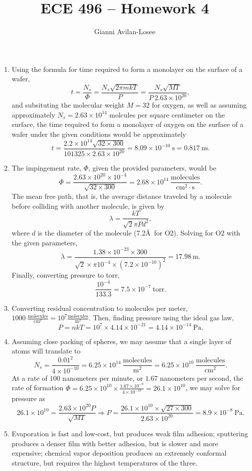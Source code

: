 \documentclass{article}
\title{ECE 496 -- Homework 4}
\author{Gianni Avilan-Losee}
\begin{document}
\setcounter{section}{6}
\setcounter{subsection}{1}
\begin{enumerate}[label=\thesubsection]
	\item Using the formula for time required to form a monolayer on the surface of a wafer,
		\[
			t=\frac{N_s}{\Phi} = \frac{N_s \sqrt{2\pi mkT}}{P} = \frac{N_s \sqrt{MT}}{P \ 2.63 \times 10^{20}},
		\]
		and subsituting the molecular weight \(M=32\) for oxygen, as well as assuming approximately \(N_s = 2.63 \times 10^{14}\) molcules per square centimeter on the surface, the time required to form a monolayer of oxygen on the surface of a wafer under the given conditions would be approximately
		\[
			t=\frac{2.2\times10^{14}\sqrt{32 \times 300}}{101325 \times 2.63 \times 10^{20}} = 8.09 \times 10^{-10} \ \mathrm{s} = 0.817 \ \mathrm{ns}.
		\]
\setcounter{subsection}{3}
\item The impingement rate, \(\Phi\), given the provided parameters, would be
	\[
		\Phi = \frac{2.63 \times 10^{20} \times 10^{-4}}{\sqrt{32 \times 300}} = 2.68 \times 10^{14} \ \mathrm{\frac{molecules}{cm^2 \cdot s}}.
	\]
	The mean free path, that is, the average distance traveled by a molecule before colliding with another molecule, is given by 
	\[
	  \lambda = \frac{kT}{\sqrt{2}\pi P d^2},
	\]
	where \(d\) is the diameter of the molecule (7.2\AA \ for O2). Solving for O2 with the given parameters,
	\[
		\lambda = \frac{1.38 \times 10^{-23} \times 300}{\sqrt{2} \times \pi 10^{-4} \times (7.2 \times 10^{-10})^2} = 17.98 \ \mathrm{m}.
	\]
	Finally, converting pressure to torr,
	\[
		\frac{10^{-4}}{133.3} = 7.5 \times 10^{-7} \ \mathrm{torr}.
	\]
	\setcounter{subsection}{5}
\item Converting residual concentration to molecules per meter, \(1000 \ \mathrm{\frac{molecules}{cm^2}} = 10^{7} \mathrm{\frac{molecules}{m^2}}\). Then, finding pressure using the ideal gas law,
	\[
		P = nkT = 10^7 \times 4.14 \times 10^{-21} = 4.14 \times 10^{-14} \ \mathrm{Pa}.
	\]
	\setcounter{subsection}{6}
\item Assuming close packing of spheres, we may assume that a single layer of atoms will translate to 
	\[
		N_s=\frac{0.01^2}{4\times10^{-10}} = 6.25 \times 10^{14} \ \mathrm{\frac{molecules}{m^2}} = 6.25 \times 10^{10} \ \mathrm{\frac{molecules}{cm^2}}.
	\]
	At a rate of \(100\) nanometers per minute, or \(1.67\) nanometers per second, the rate of formation \(\Phi=6.25 \times 10^{10} \times \frac{1.67 \times 10^{-9}}{4 \times 10^{-10}} = 26.1 \times 10^{10}\), we may solve for pressure as 
	\[
		26.1 \times 10^{10} = \frac{2.63 \times 10^{20} P }{\sqrt{MT}} \Rightarrow P = \frac{26.1 \times 10^{10} \times \sqrt{27 \times 300}}{2.63 \times 10^{20}} = 8.9 \times 10^{-8} \ \mathrm{Pa}.
	\]
	\setcounter{subsection}{13}
\item Evaporation is fast and low-cost, but produces weak film adhesion; sputtering produces a denser film with better adhesion, but is slower and more expensive; chemical vapor deposition produces an extremely conformal structure, but requires the highest temperatures of the three.
\end{enumerate}
\end{document}
